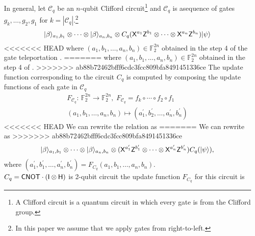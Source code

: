 In general, let $\mathcal{C}_q$ be an $n$-qubit Clifford circuit\footnote{A Clifford circuit is a quantum circuit in which every gate is from the Clifford group.} and $\mathcal{C}_q$ is asequence of gates $g_k,\ldots,g_2,g_1$ for $k=|\mathcal{C}_q|.$\footnote{In this paper we assume that we apply gates from right-to-left.}
\begin{equation}
\label{relation:update}
\begin{aligned}
 {\lvert}\beta\rangle_{a_1,b_1}\otimes \cdots \otimes {\lvert}\beta\rangle_{a_n,b_n} \otimes C_q({\sf X}^{a_1}{\sf Z}^{b_1}\otimes \cdots \otimes{\sf X}^{a_n}{\sf Z}^{b_n}){\lvert}\psi\rangle
\end{aligned}
\end{equation}
<<<<<<< HEAD
where  $(a_1,b_1,\ldots,a_n,b_n)\in\mathbb{F}_2^{2n}$ obtained in the step 4 of the gate teleportation .
=======
where  $(a_1,b_1,\ldots,a_n,b_n)\in\mathbb{F}_2^{2n}$ obtained in the step 4 of .
>>>>>>> ab88b72462bfff6cdc3fcc809bfa8491451336ce
The update function corresponding to the circuit $C_q$ is computed by composing the update functions of each gate in $\mathcal{C}_q$
\begin{equation*}
\begin{aligned}
F_{\mathcal{C}_q}:\, \mathbb{F}_2^{2n} \rightarrow  \mathbb{F}_2^{2n}, \; F_{\mathcal{C}_q}=f_k\circ\cdots \circ f_2 \circ f_1 \\(a_1,b_1,\dots, a_n,b_n)\mapsto (a_1^\prime,b_2^\prime,\dots, a_n^\prime,b_n^\prime)
 \end{aligned}
\end{equation*}
<<<<<<< HEAD
We can rewrite the relation  as
=======
We can rewrite  as
>>>>>>> ab88b72462bfff6cdc3fcc809bfa8491451336ce
\begin{equation*}
\begin{aligned}
{\lvert}\beta\rangle_{a_1,b_1}\otimes \cdots \otimes {\lvert}\beta\rangle_{a_n,b_n} \otimes ({\sf X}^{a_1^\prime}{\sf Z}^{b_1^\prime}\otimes \cdots \otimes{\sf X}^{a_n^\prime}{\sf Z}^{b_n^\prime})C_q({\lvert}\psi\rangle),
 \end{aligned}
\end{equation*}
where $(a_1^\prime,b_1^\prime,\dots, a_n^\prime,b_n^\prime)=F_{C_q}(a_1,b_1,\ldots,a_n,b_n).$ \\

 $C_q={\sf CNOT} \cdot ({\sf I} \otimes {\sf H})$ is 2-qubit circuit the update function $F_{C_q}$ for this circuit is

